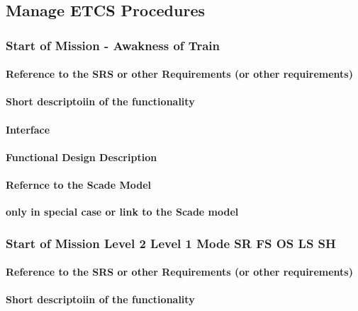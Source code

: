 \subsection{Manage ETCS Procedures}

\subsubsection{Start of Mission - Awakness of Train}%
\paragraph{Reference to the SRS or other Requirements (or other requirements)}
\paragraph{Short descriptoiin of the functionality}
\paragraph{Interface}
\paragraph{Functional Design Description}
\paragraph{Refernce to the Scade Model}
\textbf{only in special case or link to the Scade model}

\subsubsection{Start of Mission Level 2 Level 1 Mode SR FS OS LS SH}%
\paragraph{Reference to the SRS or other Requirements (or other requirements)}
\paragraph{Short descriptoiin of the functionality}
